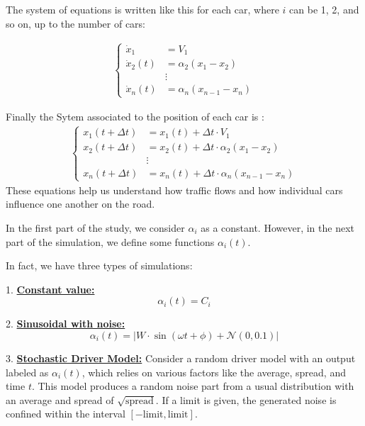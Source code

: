 \documentclass{article}
\begin{document}
			The system of equations is written like this for each car, where \(i\) can be 1, 2, and so on, up to the number of cars:
			
			\begin{align*}
				\left\{
				\begin{array}{ll}
					\dot{x}_1 &= V_1 \\
					\dot{x}_2(t) &= \alpha_2(x_1 - x_2) \\
					&\vdots \\
					\dot{x}_n(t) &= \alpha_n(x_{n-1} - x_n)
				\end{array}
				\right.
			\end{align*}
			
			
			Finally the Sytem associated to the position of each car is : 
			\begin{align*}
				\left\{
				\begin{array}{ll}
					x_1(t + \Delta t) &= x_1(t) + \Delta t  \cdot V_1\\
					x_2(t + \Delta t) &= x_2(t) + \Delta t  \cdot \alpha_2(x_1 - x_2) \\
					&\vdots \\
					x_n(t + \Delta t) &= x_n(t) + \Delta t \cdot  \alpha_n(x_{n-1} - x_n)
				\end{array}
				\right.
			\end{align*}
			These equations help us understand how traffic flows and how individual cars influence one another on the road.
			
			In the first part of the study, we consider $\alpha_i$ as a constant. However, in the next part of the simulation, we define some functions $\alpha_i(t)$.
			
			In fact, we have three types of simulations:
			
			1. \textbf{\underline{Constant value:}}
			\[
			\alpha_i(t) = C_i
			\]
			
			2. \textbf{\underline{Sinusoidal with noise:}}
			\[
			\alpha_i(t) = \left| W \cdot \sin(\omega t + \phi) + \mathcal{N}(0, 0.1) \right|
			\]
			
			3. \textbf{\underline{Stochastic Driver Model:}} \newline \newline
			Consider a random driver model with an output labeled as \( \alpha_i(t) \), which relies on various factors like the average, spread, and time \( t \). This model produces a random noise part from a usual distribution with an average and spread of \( \sqrt{\text{spread}} \). If a limit is given, the generated noise is confined within the interval \([- \text{limit}, \text{limit}]\). \newline \newline
			
\end{document}
